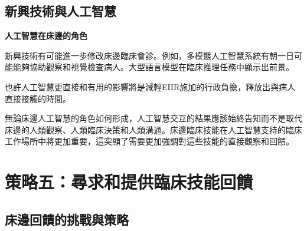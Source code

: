 \documentclass[12pt,a4paper]{article}
\begin{document}
\subsection{新興技術與人工智慧}

\begin{importantbox}
\textbf{人工智慧在床邊的角色}

新興技術有可能進一步修改床邊臨床會診。例如，多模態人工智慧系統有朝一日可能能夠協助觀察和視覺檢查病人。大型語言模型在臨床推理任務中顯示出前景。

也許人工智慧更直接和有用的影響將是減輕EHR施加的行政負擔，釋放出與病人直接接觸的時間。

無論床邊人工智慧的角色如何形成，人工智慧交互的結果應該始終告知而不是取代床邊的人類觀察、人類臨床決策和人類溝通。床邊臨床技能在人工智慧支持的臨床工作場所中將更加重要，這突顯了需要更加強調對這些技能的直接觀察和回饋。
\end{importantbox}

\section{策略五：尋求和提供臨床技能回饋}

\subsection{床邊回饋的挑戰與策略}
\end{document}
